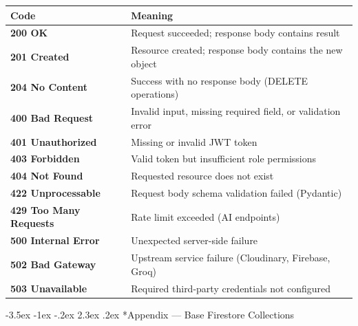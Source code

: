 \documentclass[12pt,a4paper]{article}
\makeatletter
\renewcommand\section{\@startsection{section}{1}{\z@}%
  {-3.5ex \@plus -1ex \@minus -.2ex}%
  {2.3ex \@plus .2ex}%
  {\normalfont\Large\bfseries\color{navydark}}}
\makeatother
\begin{document}
\begin{tabularx}{\linewidth}{>{\ttfamily\bfseries}l X}
\toprule
Code & Meaning \\
\midrule
200 OK             & Request succeeded; response body contains result \\
201 Created        & Resource created; response body contains the new object \\
204 No Content     & Success with no response body (DELETE operations) \\
400 Bad Request    & Invalid input, missing required field, or validation error \\
401 Unauthorized   & Missing or invalid JWT token \\
403 Forbidden      & Valid token but insufficient role permissions \\
404 Not Found      & Requested resource does not exist \\
422 Unprocessable  & Request body schema validation failed (Pydantic) \\
429 Too Many Requests & Rate limit exceeded (AI endpoints) \\
500 Internal Error & Unexpected server-side failure \\
502 Bad Gateway    & Upstream service failure (Cloudinary, Firebase, Groq) \\
503 Unavailable    & Required third-party credentials not configured \\
\bottomrule
\end{tabularx}

\vspace{1cm}

\section*{Appendix — Base Firestore Collections}
\end{document}
